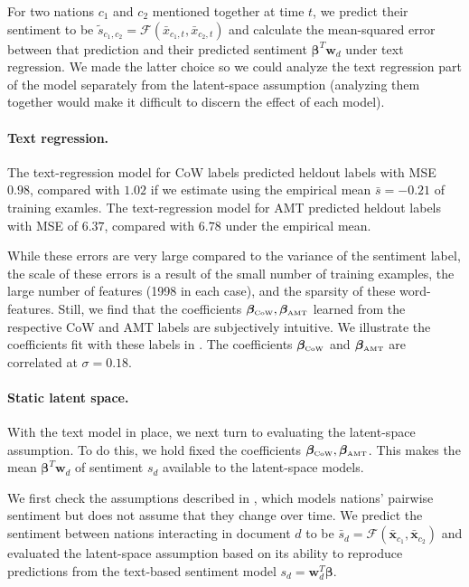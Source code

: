 For two nations $c_1$ and $c_2$ mentioned together at time $t$, we
predict their sentiment to be $\tilde s_{c_1, c_2} = \mathcal{F}(\bar
x_{c_1,t}, \bar x_{c_2, t})$ and calculate the mean-squared error
between that prediction and their predicted sentiment $\bm \beta^T \bm
w_d$ under text regression. We made the latter choice so we could
analyze the text regression part of the model separately from the
latent-space assumption (analyzing them together would make it
difficult to discern the effect of each model).

\paragraph{Text regression.} The text-regression model for CoW labels
predicted heldout labels with MSE $0.98$, compared with $1.02$ if we
estimate using the empirical mean $\bar s=-0.21$ of training
examles. The text-regression model for AMT predicted heldout labels
with MSE of $6.37$, compared with $6.78$ under the empirical mean.

While these errors are very large compared to the variance of the
sentiment label, the scale of these errors is a result of the small
number of training examples, the large number of features (1998 in
each case), and the sparsity of these word-features.  Still, we find that
the coefficients $\bm \beta_{\mbox{\tiny CoW}}, \bm \beta_{\mbox{\tiny
    AMT}}$ learned from the respective CoW and AMT labels are
subjectively intuitive.  We illustrate the coefficients fit with
these labels in .  The coefficients $\bm
\beta_{\mbox{\tiny CoW}}$ and $\bm \beta_{\mbox{\tiny AMT}}$ are
correlated at $\sigma=0.18$.

\paragraph{Static latent space.}
With the text model in place, we next turn to evaluating the
latent-space assumption.  To do this, we hold fixed the coefficients
$\bm \beta_{\mbox{\tiny CoW}}, \bm \beta_{\mbox{\tiny AMT}}$.  This
makes the mean $\bm \beta^T \bm w_d$ of sentiment $s_d$ available to
the latent-space models.

We first check the assumptions described in
, which models nations' pairwise
sentiment but does not assume that they change over time.  We predict
the sentiment between nations interacting in document $d$ to be
$\bar s_d = \mathcal{F}(\bm \bar x_{c_1}, \bm \bar x_{c_2})$ and
evaluated the latent-space assumption based on its ability to
reproduce predictions from the text-based sentiment model $s_d = \bm
w_d^T \bm \beta$.

